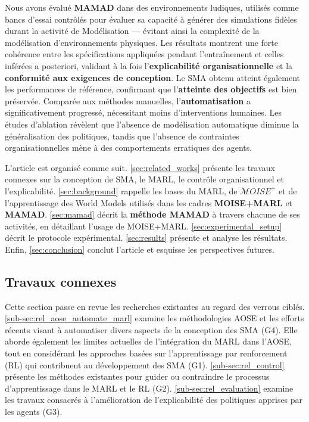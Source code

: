 Nous avons évalué \textbf{MAMAD} dans des environnements ludiques, utilisés comme bancs d'essai contrôlés pour évaluer sa capacité à générer des simulations fidèles durant la activité de Modélisation — évitant ainsi la complexité de la modélisation d'environnements physiques. Les résultats montrent une forte cohérence entre les spécifications appliquées pendant l'entraînement et celles inférées a posteriori, validant à la fois l'\textbf{explicabilité organisationnelle} et la \textbf{conformité aux exigences de conception}. Le SMA obtenu atteint également les performances de référence, confirmant que l'\textbf{atteinte des objectifs} est bien préservée. Comparée aux méthodes manuelles, l'\textbf{automatisation} a significativement progressé, nécessitant moins d'interventions humaines. Les études d'ablation révèlent que l'absence de modélisation automatique diminue la généralisation des politiques, tandis que l'absence de contraintes organisationnelles mène à des comportements erratiques des agents.

\vspace{0.5em}

L'article est organisé comme suit. \autoref{sec:related_works} présente les travaux connexes sur la conception de SMA, le MARL, le contrôle organisationnel et l'explicabilité. \autoref{sec:background} rappelle les bases du MARL, de $\mathcal{M}OISE^+$ et de l'apprentissage des World Models utilisés dans les cadres \textbf{MOISE+MARL} et \textbf{MAMAD}. \autoref{sec:mamad} décrit la \textbf{méthode MAMAD} à travers chacune de ses activités, en détaillant l'usage de MOISE+MARL. \autoref{sec:experimental_setup} décrit le protocole expérimental. \autoref{sec:results} présente et analyse les résultats. Enfin, \autoref{sec:conclusion} conclut l'article et esquisse les perspectives futures.


\subsection{Travaux connexes}\label{sec:related_works}

Cette section passe en revue les recherches existantes au regard des verrous ciblés. \autoref{sub-sec:rel_aose_automate_marl} examine les méthodologies AOSE et les efforts récents visant à automatiser divers aspects de la conception des SMA (G4). Elle aborde également les limites actuelles de l'intégration du MARL dans l'AOSE, tout en considérant les approches basées sur l'apprentissage par renforcement (RL) qui contribuent au développement des SMA (G1). \autoref{sub-sec:rel_control} présente les méthodes existantes pour guider ou contraindre le processus d'apprentissage dans le MARL et le RL (G2).
\autoref{sub-sec:rel_evaluation} examine les travaux consacrés à l'amélioration de l'explicabilité des politiques apprises par les agents (G3).

